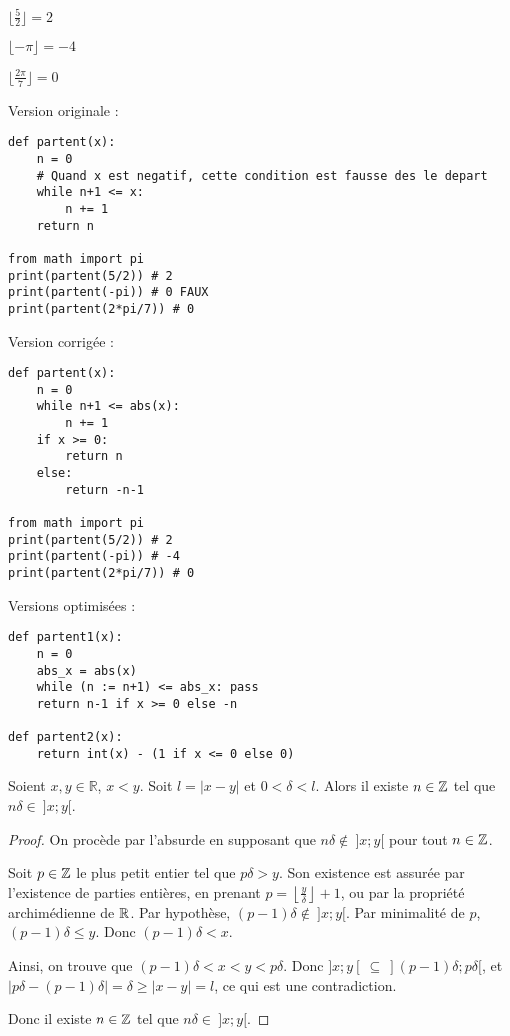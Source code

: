 \documentclass[]{../templates/homework}
\providecommand{\floor}[1]{\left \lfloor #1 \right \rfloor }
\begin{document}

\subproblem

$\lfloor\frac{5}{2}\rfloor = 2$

$\lfloor-\pi\rfloor = -4$

$\lfloor\frac{2\pi}{7}\rfloor = 0$

\hfill

Version originale :
\begin{vscodebox}
\begin{lstlisting}
def partent(x):
	n = 0
	# Quand x est negatif, cette condition est fausse des le depart
	while n+1 <= x:
		n += 1
	return n

from math import pi
print(partent(5/2)) # 2
print(partent(-pi)) # 0 FAUX
print(partent(2*pi/7)) # 0
\end{lstlisting}
\end{vscodebox}

\hfill

Version corrigée :

\begin{vscodebox}
\begin{lstlisting}
def partent(x):
	n = 0
	while n+1 <= abs(x):
		n += 1
	if x >= 0:
		return n
	else:
		return -n-1

from math import pi
print(partent(5/2)) # 2
print(partent(-pi)) # -4
print(partent(2*pi/7)) # 0
\end{lstlisting}
\end{vscodebox}

\hfill

Versions optimisées :

\begin{vscodebox}
\begin{lstlisting}
def partent1(x):
	n = 0
	abs_x = abs(x)
	while (n := n+1) <= abs_x: pass
	return n-1 if x >= 0 else -n

def partent2(x):
	return int(x) - (1 if x <= 0 else 0)
\end{lstlisting}
\end{vscodebox}

\subproblem
\question
\begin{thm}
	Soient $x,y\in\mathbb R$, $x<y$. Soit $l = |x-y|$ et $0 < \delta < l$. Alors il existe $n\in \mathbb Z$ tel que $n\delta \in\ ]x;y[$.
\end{thm}
\begin{proof}
	On procède par l'absurde en supposant que $n\delta \not\in\ ]x;y[$ pour tout $n\in\mathbb Z$.
	
	Soit $p\in\mathbb Z$ le plus petit entier tel que $p\delta > y$. Son existence est assurée par l'existence de parties entières, en prenant $p = \floor {\frac y \delta} + 1$, ou par la propriété archimédienne de $\mathbb R$.
	Par hypothèse, $(p-1) \delta \not \in\ ]x;y[$. Par minimalité de $p$, $(p-1)\delta \leq y$. Donc $(p-1)\delta < x$.
	
	Ainsi, on trouve que $(p-1)\delta < x < y < p\delta$. Donc $]x;y[\ \subseteq \  ](p-1)\delta; p\delta[$, et $|p\delta - (p-1)\delta| = \delta \geq |x-y| = l$, ce qui est une contradiction.
	
	Donc il existe $n\in\mathbb Z$ tel que $n\delta \in \ ]x;y[$.
\end{proof}
\end{document}
